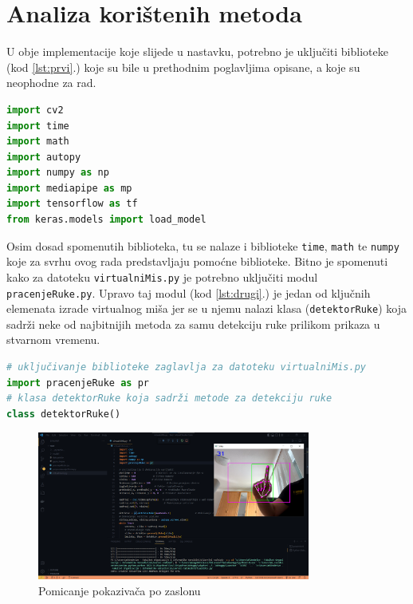 \documentclass[]{foi} %
\begin{document}
\newpage
\section{Analiza korištenih metoda}

U obje implementacije koje slijede u nastavku, potrebno je uključiti biblioteke (kod \ref{lst:prvi}.) koje su bile u prethodnim poglavljima opisane, a koje su neophodne za rad.

\begin{lstlisting}[language=Python, caption={[Biblioteke] Biblioteke}, label=lst:prvi]
import cv2
import time
import math
import autopy
import numpy as np
import mediapipe as mp
import tensorflow as tf
from keras.models import load_model
\end{lstlisting}

Osim dosad spomenutih biblioteka, tu se nalaze i biblioteke \texttt{time}, \texttt{math} te \texttt{numpy} koje za svrhu ovog rada predstavljaju pomoćne biblioteke. Bitno je spomenuti kako za datoteku \texttt{virtualniMis.py} je potrebno uključiti modul \texttt{pracenjeRuke.py}. Upravo taj modul (kod \ref{lst:drugi}.) je jedan od ključnih elemenata izrade virtualnog miša jer se u njemu nalazi klasa (\texttt{detektorRuke}) koja sadrži neke od najbitnijih metoda za samu detekciju ruke prilikom prikaza u stvarnom vremenu.

\begin{lstlisting}[language=Python, caption={[Klasa detektorRuke] Klasa detektorRuke}, label=lst:drugi]
# uključivanje biblioteke zaglavlja za datoteku virtualniMis.py
import pracenjeRuke as pr
# klasa detektorRuke koja sadrži metode za detekciju ruke
class detektorRuke()
\end{lstlisting}

\begin{figure}[!ht]
    \centering
    \includegraphics[width=0.8\textwidth]{slike/mis1.png}
    \caption{Pomicanje pokazivača po zaslonu}
    \label{fig:mis1}
\end{figure}
\end{document}
